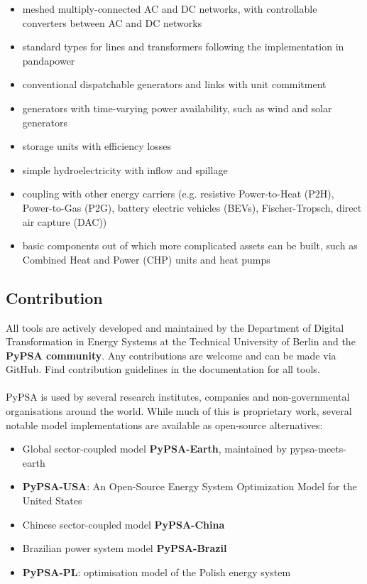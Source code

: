 \documentclass[a0,portrait]{a0poster}
\begin{document}
\begin{multicols}{3}
\begin{itemize}
    \item meshed multiply-connected AC and DC networks, with controllable converters between AC and DC networks
    \item standard types for lines and transformers following the implementation in pandapower
    \item conventional dispatchable generators and links with unit commitment
    \item generators with time-varying power availability, such as wind and solar generators
    \item storage units with efficiency losses
    \item simple hydroelectricity with inflow and spillage
    \item coupling with other energy carriers (e.g. resistive Power-to-Heat (P2H), Power-to-Gas (P2G), battery electric vehicles (BEVs), Fischer-Tropsch, direct air capture (DAC))
    \item basic components out of which more complicated assets can be built, such as Combined Heat and Power (CHP) units and heat pumps
\end{itemize}

\vspace{2em}
\begin{tcolorbox}[width=0.95\linewidth,colback={conclusion},frame empty,boxsep=1cm]
\section*{Contribution}
  All tools are actively developed and maintained by the Department of Digital 
  Transformation in Energy Systems at the Technical University of Berlin and the 
  \textbf{PyPSA community}. Any contributions are welcome and can be made via GitHub. 
  Find contribution guidelines in the documentation for all tools. \\
  \\
  PyPSA is used by several research institutes, companies and non-governmental 
  organisations around the world. While much of this is proprietary work, several 
  notable model implementations are available as open-source alternatives:
  \begin{itemize}
    \item Global sector-coupled model \textbf{PyPSA-Earth}, maintained by pypsa-meets-earth \cite{pypsa-earth}
    \item \textbf{PyPSA-USA}: An Open-Source Energy System Optimization Model for the United States
    \item Chinese sector-coupled model \textbf{PyPSA-China} \cite{pypsa-china}
    \item Brazilian power system model \textbf{PyPSA-Brazil} \cite{pypsa-brazil}
    \item \textbf{PyPSA-PL}: optimisation model of the Polish energy system
  \end{itemize}




\end{tcolorbox}
\end{multicols}
\end{document}
